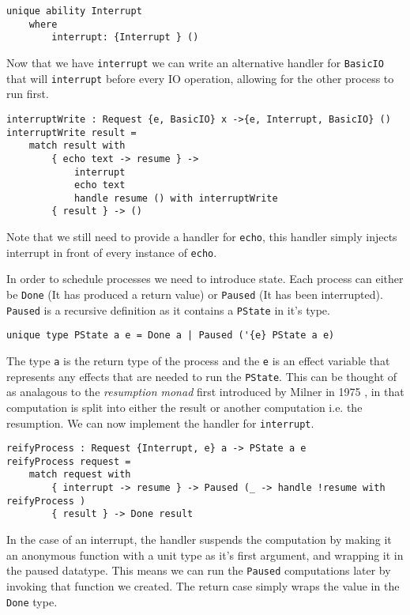 \documentclass[logo,bsc,singlespacing,parskip]{infthesis}
\begin{document}
\begin{lstlisting}[language=unison]
unique ability Interrupt
    where
        interrupt: {Interrupt } ()
\end{lstlisting}

Now that we have \texttt{interrupt} we can write an alternative handler for
\texttt{BasicIO} that will \texttt{interrupt} before every IO operation,
allowing for the other process to run first.

\begin{lstlisting}[language=unison]
interruptWrite : Request {e, BasicIO} x ->{e, Interrupt, BasicIO} ()
interruptWrite result =
    match result with
        { echo text -> resume } -> 
            interrupt
            echo text 
            handle resume () with interruptWrite
        { result } -> ()
\end{lstlisting}

Note that we still need to provide a handler for \texttt{echo}, this handler
simply injects interrupt in front of every instance of \texttt{echo}.

In order to schedule processes we need to introduce state. Each process can either be \texttt{Done} (It has produced a return value) or \texttt{Paused} (It has been interrupted). \texttt{Paused} is a recursive definition as it contains a \texttt{PState} in it's type.

\begin{lstlisting}[language=unison]
unique type PState a e = Done a | Paused ('{e} PState a e)
\end{lstlisting}

The type \texttt{a} is the return type of the process and the \texttt{e} is an
effect variable that represents any effects that are needed to run the
\texttt{PState}. This can be thought of as analagous to the \emph{resumption
monad} first introduced by Milner in 1975 \cite{MILNER1975157}, in that
computation is split into either the result or another computation i.e. the
resumption. We can now implement the handler for \texttt{interrupt}.

\begin{lstlisting}[language=unison]
reifyProcess : Request {Interrupt, e} a -> PState a e
reifyProcess request =
    match request with
        { interrupt -> resume } -> Paused (_ -> handle !resume with reifyProcess )
        { result } -> Done result
\end{lstlisting}

In the case of an interrupt, the handler suspends the computation by making it
an anonymous function with a unit type as it's first argument, and wrapping it
in the paused datatype. This means we can run the \texttt{Paused} computations
later by invoking that function we created. The return case simply wraps the
value in the \texttt{Done} type. 
\end{document}
